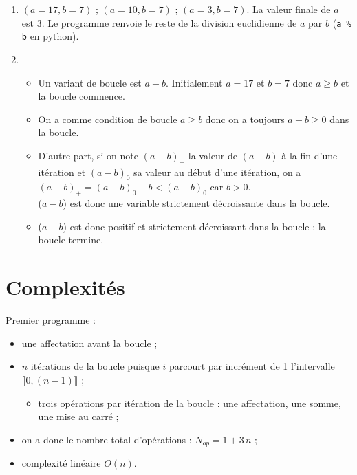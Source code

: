 \begin{enumerate}

\item $(a=17,b=7)$ ; $(a=10,b=7)$ ; $(a=3,b=7)$. La valeur finale de $a$ est 3. Le programme renvoie le reste de la division euclidienne de $a$ par $b$ (\texttt{a \% b} en python).

\item 
\begin{itemize}
\item Un variant de boucle est $a-b$. Initialement $a=17$ et $b=7$ donc $a\geq b$ et la boucle commence.

\item On a comme condition de boucle $a \geq b$ donc on a toujours $a-b \geq0$ dans la boucle.

\item D'autre part, si on note $(a-b)_+$ la valeur de $(a-b)$ à la fin d'une itération et $(a-b)_0$ sa valeur au début d'une itération, on a $(a-b)_+ = (a-b)_0 - b < (a-b)_0$ car $b>0$.\\($a-b$) est donc une variable strictement décroissante dans la boucle.

\item ($a-b$) est donc positif et strictement décroissant dans la boucle : la boucle termine.

\end{itemize}

\end{enumerate}

\section{Complexités}

Premier programme : 
\begin{itemize}
  \item une affectation avant la boucle ;
  \item $n$ itérations de la boucle puisque $i$ parcourt par incrément de 1 l'intervalle $\llbracket 0, (n-1) \rrbracket$ ; 
      \begin{itemize}
      \item trois opérations par itération de la boucle : une affectation, une somme, une mise au carré ;                                                                                                                                                                         \end{itemize}
  \item on a donc le nombre total d'opérations : $N_{op} = 1 + 3\,n$ ;
  \item complexité linéaire $O(n)$.
\end{itemize}

